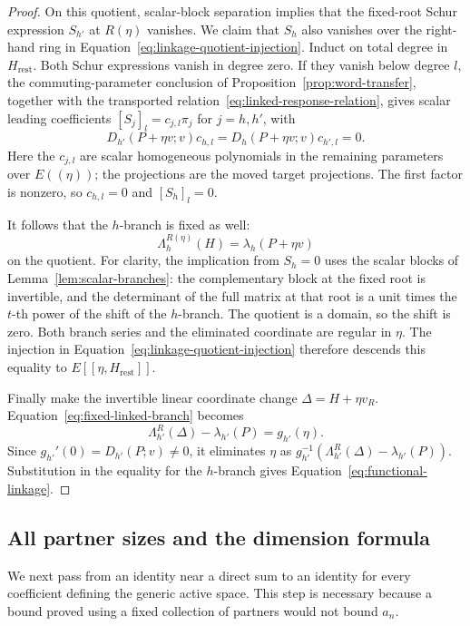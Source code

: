 \begin{proof}
On this quotient, scalar-block separation implies that the fixed-root
Schur expression $S_{h'}$ at $R(\eta)$ vanishes.  We claim that $S_h$
also vanishes over the right-hand ring in
Equation~\eqref{eq:linkage-quotient-injection}.  Induct on total degree
in $H_{\mathrm{rest}}$.  Both Schur expressions vanish in degree zero.
If they vanish below degree $l$, the commuting-parameter conclusion of
Proposition~\ref{prop:word-transfer}, together with the transported
relation~\eqref{eq:linked-response-relation}, gives scalar leading
coefficients $[S_j]_l=c_{j,l}\pi_j$ for $j=h,h'$, with
\[
 D_{h'}(P+\eta v;v)c_{h,l}
   =D_h(P+\eta v;v)c_{h',l}=0.
\]
Here the $c_{j,l}$ are scalar homogeneous polynomials in the remaining
parameters over $E((\eta))$; the projections are the moved target
projections. The first factor is nonzero, so $c_{h,l}=0$ and
$[S_h]_l=0$.

It follows that the $h$-branch is fixed as well:
\[
 \Lambda_h^{R(\eta)}(H)=\lambda_h(P+\eta v)
\]
on the quotient.  For clarity, the implication from $S_h=0$ uses the
scalar blocks of Lemma~\ref{lem:scalar-branches}: the complementary
block at the fixed root is invertible, and the determinant of the full
matrix at that root is a unit times the $t$-th power of the shift of
the $h$-branch.  The quotient is a domain, so the shift is zero.
Both branch series and the eliminated coordinate are regular in
$\eta$.  The injection in
Equation~\eqref{eq:linkage-quotient-injection} therefore descends this
equality to $E[[\eta,H_{\mathrm{rest}}]]$.

Finally make the invertible linear coordinate change
$\Delta=H+\eta v_R$.  Equation~\eqref{eq:fixed-linked-branch} becomes
\[
 \Lambda_{h'}^R(\Delta)-\lambda_{h'}(P)=g_{h'}(\eta).
\]
Since $g_{h'}'(0)=D_{h'}(P;v)\neq0$, it eliminates $\eta$ as
$g_{h'}^{-1}(\Lambda_{h'}^R(\Delta)-\lambda_{h'}(P))$.
Substitution in the equality for the $h$-branch gives
Equation~\eqref{eq:functional-linkage}.
\end{proof}

\subsection{All partner sizes and the dimension formula}

We next pass from an identity near a direct sum to an identity for
every coefficient defining the generic active space.  This step is
necessary because a bound proved using a fixed collection of partners
would not bound $a_n$.

